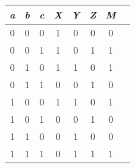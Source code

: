 \begin{tabular}{|c|c|c|c|c|c|c|c|}
\hline
\textit{\textbf{a}} &\textit{\textbf{b}}  & \textit{\textbf{c}} & \textit{\textbf{X}} & \textit{\textbf{Y}}&\textit{\textbf{Z}} &\textit{\textbf{M}}\\\hline
0                   & 0                   & 0                   & 1                   & 0                  & 0                  & 0                 \\
0                   & 0                   & 1                   & 1                   & 0                  & 1                  & 1                 \\
0                   & 1                   & 0                   & 1                   & 1                  & 0                  & 1                 \\
0                   & 1                   & 1                   & 0                   & 0                  & 1                  & 0                 \\
1                   & 0                   & 0                   & 1                   & 1                  & 0                  & 1                 \\
1                   & 0                   & 1                   & 0                   & 0                  & 1                  & 0                 \\
1                   & 1                   & 0                   & 0                   & 1                  & 0                  & 0                 \\
1                   & 1                   & 1                   & 0                   & 1                  & 1                  & 1                  \\\hline
\end{tabular}